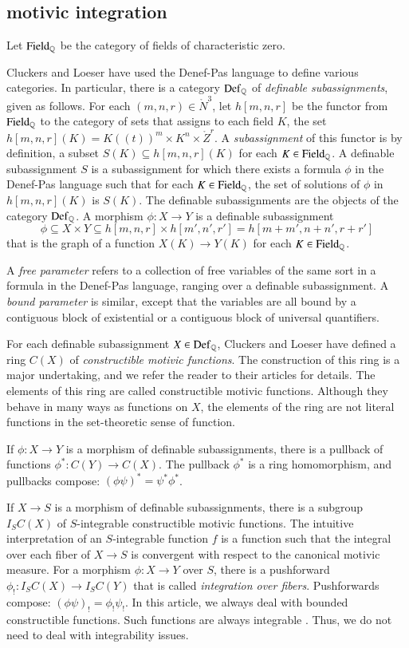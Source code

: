 \subsection{motivic integration}

Let ${\operatorname{Field}}_{\mathbb{Q}}$ be the category of fields of characteristic zero.

Cluckers and Loeser have used the Denef-Pas language to define various
categories.  In particular, there is a category ${\operatorname{Def}}_{\mathbb{Q}}$ of {\it
  definable subassignments}, given as follows.  For each
$(m,n,r)\in\ring{N}^3$, let $h[m,n,r]$ be the functor from
${\operatorname{Field}}_{\mathbb{Q}}$ to the category of sets that assigns to each field
$K$, the set $h[m,n,r](K)=K((t))^m\times K^n\times \ring{Z}^r$.  A
{\it subassignment} of this functor is by definition, a subset $S(K)
\subseteq h[m,n,r](K)$ for each $K\in{\operatorname{Field}}_{\mathbb{Q}}$.  A definable
subassignment $S$ is a subassignment for which there exists a formula
$\phi$ in the Denef-Pas language such that for each
$K\in{\operatorname{Field}}_{\mathbb{Q}}$, the set of solutions of $\phi$ in $h[m,n,r](K)$
is $S(K)$.  The definable subassignments are the objects of the
category ${\operatorname{Def}}_{\mathbb{Q}}$.  A morphism $\phi:X\to Y$ is a definable
subassignment
\[
\phi\subseteq X\times Y
\subseteq h[m,n,r]\times h[m',n',r'] = h[m+m',n+n',r+r']
\]
that is the graph of a function $X(K)\to Y(K)$ for each $K\in
{\operatorname{Field}}_{\mathbb{Q}}$.

A {\it free parameter} refers to a collection of free variables of the
same sort in a formula in the Denef-Pas language, ranging over a
definable subassignment.  A {\it bound parameter} is similar, except that
the variables are all bound by a contiguous block of existential or a
contiguous block of universal quantifiers.

For each definable subassignment $X\in {\operatorname{Def}}_{\mathbb{Q}}$, Cluckers and
Loeser have defined a ring $C(X)$ of {\it constructible motivic
  functions}.  The construction of this ring is a major undertaking,
and we refer the reader to their articles for details.  The elements
of this ring are called constructible motivic functions.  Although
they behave in many ways as functions on $X$, the elements of the ring
are not literal functions in the set-theoretic sense of function.

If $\phi:X\to Y$ is a morphism of definable subassignments, there is a
pullback of functions $\phi^*:C(Y)\to C(X)$.  The pullback $\phi^*$ is
a ring homomorphism, and pullbacks compose: $(\phi\psi)^* = \psi^*
\phi^*$.

If $X\to S$ is a morphism of definable subassignments, there is a
subgroup $I_S C(X)$ of $S$-integrable constructible motivic functions.
The intuitive interpretation of an $S$-integrable function $f$ is a
function such that the integral over each fiber of $X\to S$ is
convergent with respect to the canonical motivic measure.  For a
morphism $\phi: X\to Y$ over $S$, there is a pushforward
$\phi_!:I_SC(X)\to I_SC(Y)$ that is called {\it integration over
  fibers}.  Pushforwards compose: $(\phi\psi)_! = \phi_!\psi_!$.  In
this article, we always deal with bounded constructible functions.
Such functions are always integrable
\cite[Prop~12.2.2]{cluckers2008constructible}.  Thus, we do not need
to deal with integrability issues.

